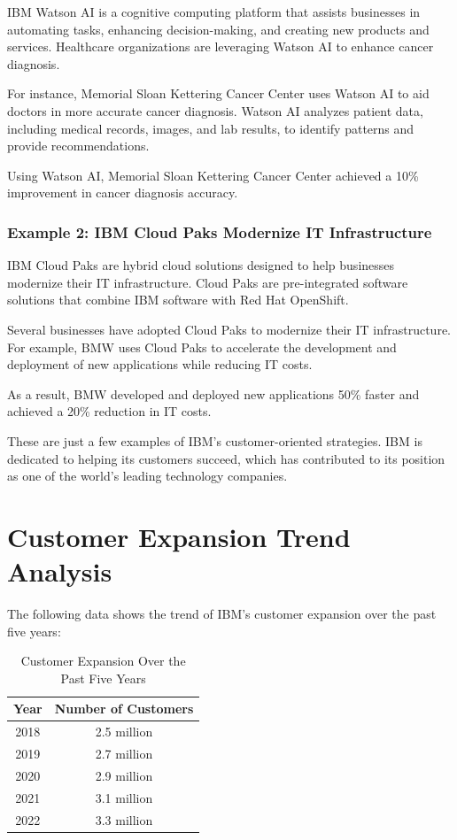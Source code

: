IBM Watson AI is a cognitive computing platform that assists businesses in automating tasks, enhancing decision-making, and creating new products and services. Healthcare organizations are leveraging Watson AI to enhance cancer diagnosis.

For instance, Memorial Sloan Kettering Cancer Center uses Watson AI to aid doctors in more accurate cancer diagnosis. Watson AI analyzes patient data, including medical records, images, and lab results, to identify patterns and provide recommendations.

Using Watson AI, Memorial Sloan Kettering Cancer Center achieved a 10\% improvement in cancer diagnosis accuracy.

\subsubsection{Example 2: IBM Cloud Paks Modernize IT Infrastructure}

IBM Cloud Paks are hybrid cloud solutions designed to help businesses modernize their IT infrastructure. Cloud Paks are pre-integrated software solutions that combine IBM software with Red Hat OpenShift.

Several businesses have adopted Cloud Paks to modernize their IT infrastructure. For example, BMW uses Cloud Paks to accelerate the development and deployment of new applications while reducing IT costs.

As a result, BMW developed and deployed new applications 50\% faster and achieved a 20\% reduction in IT costs.

These are just a few examples of IBM's customer-oriented strategies. IBM is dedicated to helping its customers succeed, which has contributed to its position as one of the world's leading technology companies.


\section{Customer Expansion Trend Analysis}

The following data shows the trend of IBM's customer expansion over the past five years:

\begin{table}[h]
\centering
\begin{tabular}{|c|c|}
\hline
Year & Number of Customers \\
\hline
2018 & 2.5 million \\
2019 & 2.7 million \\
2020 & 2.9 million \\
2021 & 3.1 million \\
2022 & 3.3 million \\
\hline
\end{tabular}
\caption{Customer Expansion Over the Past Five Years}
\end{table}

